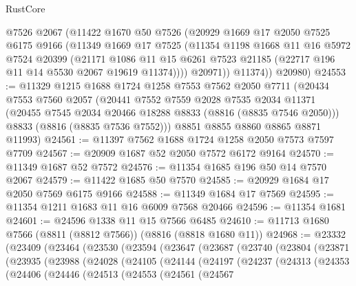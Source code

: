 \begin{lexlean}{RustCore}
\begin{coremodule}
          @7526
          @2067
          (@11422
            @1670
            @50
            @7526
            (@20929
              @1669
              @17
              @2050
              @7525
              @6175
              @9166
              (@11349
                @1669
                @17
                @7525
                (@11354
                  @1198
                  @1668
                  @11
                  @16
                  @5972
                  @7524
                  @20399
                  (@21171
                    @1086
                    @11
                    @15
                    @6261
                    @7523
                    @21185
                    (@22717 @196 @11 @14 @5530 @2067 @19619 @11374))))
              @20971))
          @11374))
      @20980)
@24553 := @11329
    @1215
    @1688
    @1724
    @1258
    @7553
    @7562
    @2050
    @7711
    (@20434
      @7553
      @7560
      @2057
      (@20441
        @7552
        @7559
        @2028
        @7535
        @2034
        @11371
        (@20455 @7545 @2034 @20466 @18288 @8833 (@8816 (@8835 @7546 @2050)))
        @8833
        (@8816 (@8835 @7536 @7552)))
      @8851
      @8855
      @8860
      @8865
      @8871
      @11993)
@24561 := @11397 @7562 @1688 @1724 @1258 @2050 @7573 @7597 @7709
@24567 := @20909 @1687 @52 @2050 @7572 @6172 @9164
@24570 := @11349 @1687 @52 @7572
@24576 := @11354 @1685 @196 @50 @14 @7570 @2067
@24579 := @11422 @1685 @50 @7570
@24585 := @20929 @1684 @17 @2050 @7569 @6175 @9166
@24588 := @11349 @1684 @17 @7569
@24595 := @11354 @1211 @1683 @11 @16 @6009 @7568 @20466
@24596 := @11354 @1681
@24601 := @24596 @1338 @11 @15 @7566 @6485
@24610 := @11713 @1680 @7566 (@8811 (@8812 @7566)) (@8816 (@8818 @1680 @11))
@24968 := @23332
    (@23409
      (@23464
        (@23530
          (@23594
            (@23647
              (@23687
                (@23740
                  (@23804
                    (@23871
                      (@23935
                        (@23988
                          (@24028
                            (@24105
                              (@24144
                                (@24197
                                  (@24237
                                    (@24313
                                      (@24353
                                        (@24406
                                          (@24446
                                            (@24513
                                              (@24553
                                                (@24561
                                                  (@24567

\end{coremodule}
\end{lexlean}
